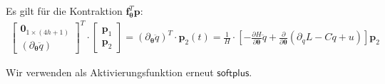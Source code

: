 \documentclass[a4paper, 12pt]{scrartcl}
\begin{document}
Es gilt für die Kontraktion $\bm{f}_{\bm{\theta}}^T \bm{p}$:
\begin{align*}
    \begin{bmatrix}
        \bm{0}_{1 \times (4h+1)}
        \\
        \left(\partial_{\bm{\theta}} \ddot{q}\right)
    \end{bmatrix}^T
    \cdot
    \begin{bmatrix}
        \bm{p}_1 \\
        \bm{p}_2
    \end{bmatrix}
    =
    \left(\partial_{\bm{\theta}} \ddot{q}\right)^T \cdot \bm{p}_2(t)
    =
    \frac{1}{H} \cdot
    \left[
        - 
        \frac{\partial H}{\partial \bm{\theta}} \ddot{q} 
        + 
        \frac{\partial}{\partial \bm{\theta}} 
        \left(\partial_q L - C \dot{q} + u \right)
    \right]
    \bm{p}_2
\end{align*}

Wir verwenden als Aktivierungsfunktion erneut $\mathsf{softplus}$.
\end{document}
